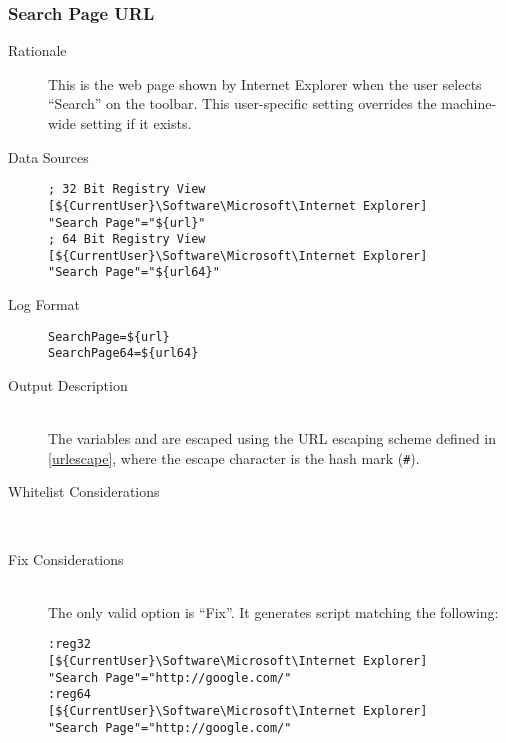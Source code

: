 \subsubsection{Search Page URL}
\begin{description}
\item[Rationale] This is the web page shown by Internet Explorer when the user
selects ``Search'' on the toolbar. This user-specific setting overrides the
machine-wide setting if it exists.

\item[Data Sources] \hfill
\vspace{-\baselineskip}
\begin{verbatim}
; 32 Bit Registry View
[${CurrentUser}\Software\Microsoft\Internet Explorer]
"Search Page"="${url}"
; 64 Bit Registry View
[${CurrentUser}\Software\Microsoft\Internet Explorer]
"Search Page"="${url64}"
\end{verbatim}
\item[Log Format] \hfill
\vspace{-\baselineskip}
\begin{verbatim} 
SearchPage=${url}
SearchPage64=${url64}
\end{verbatim}
\item[Output Description] \hfill \\
The variables  and  are escaped using the URL escaping
scheme defined in \ref{urlescape}, where the escape character is the hash mark
(\verb|#|).
\item[Whitelist Considerations] \hfill \\

\item[Fix Considerations] \hfill \\
The only valid option is ``Fix''. It generates script matching the following:
\vspace{-\baselineskip}
\begin{verbatim}
:reg32
[${CurrentUser}\Software\Microsoft\Internet Explorer]
"Search Page"="http://google.com/"
:reg64
[${CurrentUser}\Software\Microsoft\Internet Explorer]
"Search Page"="http://google.com/"
\end{verbatim}
\end{description}

